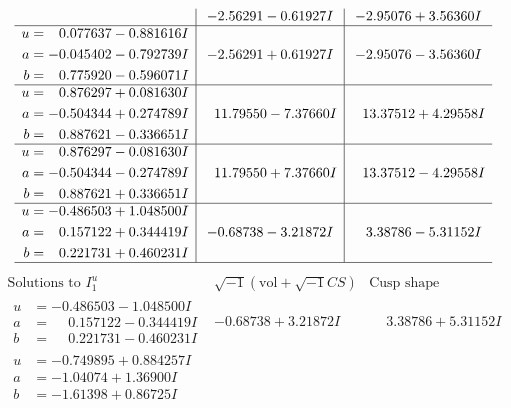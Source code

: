 \documentclass[1p]{elsarticle_modified}
\theoremstyle{definition}
\newcommand{\I}{\sqrt{-1}}
\begin{document}
$$\begin{array}{c|c|c}
 & -2.56291 - 0.61927 I & -2.95076 + 3.56360 I \\ \hline\begin{aligned}
u &= \phantom{-}0.077637 - 0.881616 I \\
a &= -0.045402 - 0.792739 I \\
b &= \phantom{-}0.775920 - 0.596071 I\end{aligned}
 & -2.56291 + 0.61927 I & -2.95076 - 3.56360 I \\ \hline\begin{aligned}
u &= \phantom{-}0.876297 + 0.081630 I \\
a &= -0.504344 + 0.274789 I \\
b &= \phantom{-}0.887621 - 0.336651 I\end{aligned}
 & \phantom{-}11.79550 - 7.37660 I & \phantom{-}13.37512 + 4.29558 I \\ \hline\begin{aligned}
u &= \phantom{-}0.876297 - 0.081630 I \\
a &= -0.504344 - 0.274789 I \\
b &= \phantom{-}0.887621 + 0.336651 I\end{aligned}
 & \phantom{-}11.79550 + 7.37660 I & \phantom{-}13.37512 - 4.29558 I \\ \hline\begin{aligned}
u &= -0.486503 + 1.048500 I \\
a &= \phantom{-}0.157122 + 0.344419 I \\
b &= \phantom{-}0.221731 + 0.460231 I\end{aligned}
 & -0.68738 - 3.21872 I & \phantom{-}3.38786 - 5.31152 I\\
 \hline 
 \end{array}$$\newpage$$\begin{array}{c|c|c}  
\text{Solutions to }I^u_{1}& \I (\text{vol} + \sqrt{-1}CS) & \text{Cusp shape}\\
 \hline 
\begin{aligned}
u &= -0.486503 - 1.048500 I \\
a &= \phantom{-}0.157122 - 0.344419 I \\
b &= \phantom{-}0.221731 - 0.460231 I\end{aligned}
 & -0.68738 + 3.21872 I & \phantom{-}3.38786 + 5.31152 I \\ \hline\begin{aligned}
u &= -0.749895 + 0.884257 I \\
a &= -1.04074 + 1.36900 I \\
b &= -1.61398 + 0.86725 I\end{aligned}

\end{array}$$
\end{document}
